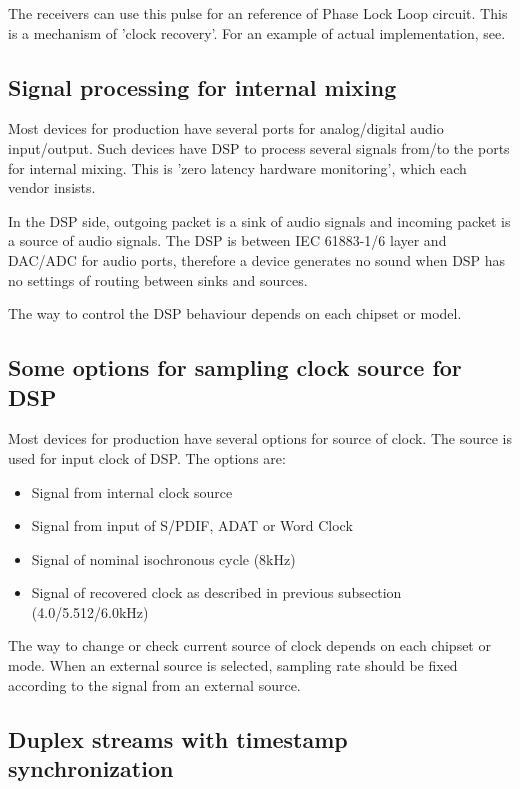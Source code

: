 \documentclass[onecolumn]{article}
\begin{document}
The receivers can use this pulse for an reference of Phase Lock Loop circuit. This is a mechanism of 'clock recovery'. For an example of actual implementation, see\cite{icelynx}.


\subsection{Signal processing for internal mixing}
\label{sec:internal-mixing}

Most devices for production have several ports for analog/digital audio input/output. Such devices have DSP to process several signals from/to the ports for internal mixing. This is 'zero latency hardware monitoring', which each vendor insists.

In the DSP side, outgoing packet is a sink of audio signals and incoming packet is a source of audio signals. The DSP is between IEC 61883-1/6 layer and DAC/ADC for audio ports, therefore a device generates no sound when DSP has no settings of routing between sinks and sources.

The way to control the DSP behaviour depends on each chipset or model.

\subsection{Some options for sampling clock source for DSP}

Most devices for production have several options for source of clock. The source is used for input clock of DSP. The options are:
\begin{itemize}
	\item Signal from internal clock source
	\item Signal from input of S/PDIF, ADAT or Word Clock
	\item Signal of nominal isochronous cycle (8kHz)
	\item Signal of recovered clock as described in previous subsection (4.0/5.512/6.0kHz)
\end{itemize}

The way to change or check current source of clock depends on each chipset or mode. When an external source is selected, sampling rate should be fixed according to the signal from an external source.

\subsection{Duplex streams with timestamp synchronization}
\label{sec:duplex-streams}
\end{document}
